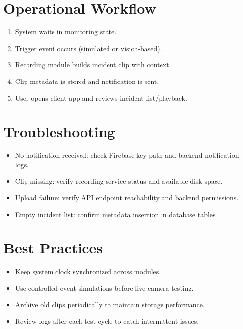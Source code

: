 \section{Operational Workflow}
\begin{enumerate}
\item System waits in monitoring state.
\item Trigger event occurs (simulated or vision-based).
\item Recording module builds incident clip with context.
\item Clip metadata is stored and notification is sent.
\item User opens client app and reviews incident list/playback.
\end{enumerate}

\section{Troubleshooting}
\begin{itemize}
\item No notification received: check Firebase key path and backend notification logs.
\item Clip missing: verify recording service status and available disk space.
\item Upload failure: verify API endpoint reachability and backend permissions.
\item Empty incident list: confirm metadata insertion in database tables.
\end{itemize}

\section{Best Practices}
\begin{itemize}
\item Keep system clock synchronized across modules.
\item Use controlled event simulations before live camera testing.
\item Archive old clips periodically to maintain storage performance.
\item Review logs after each test cycle to catch intermittent issues.
\end{itemize}